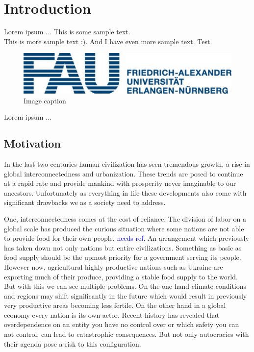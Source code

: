 \chapter{Introduction}
\label{chap:Introduction}

Lorem ipsum ...
This is some sample text.\\
This is more sample text :).
And I have even more sample text.
Test.
%
\begin{figure}[H]
	\centering
	\includegraphics[width=1\textwidth]{img/FAU}
	\caption{Image caption}
	\label{Image_Label}
\end{figure}
%
\noindent
%
Lorem ipsum ...

\section{Motivation}
\label{sec:Motivation}
In the last two centuries human civilization has seen tremendous growth, a rise in global interconnectedness and urbanization.
These trends are posed to continue at a rapid rate and provide mankind with prosperity never imaginable to our ancestors.
Unfortunately as everything in life these developments also come with significant drawbacks we as a society need to address.

One, interconnectedness comes at the cost of reliance.
The division of labor on a global scale has produced the curious situation where some nations are not able to provide food for their own people. \textcolor{blue}{needs ref.}
An arrangement which previously has taken down not only nations but entire civilizations.
Something as basic as food supply should be the upmost priority for a government serving its people.
However now, agricultural highly productive nations such as Ukraine are exporting much of their produce, providing a stable food supply to the world.
But with this we can see multiple problems.
On the one hand climate conditions and regions may shift significantly in the future which would result in previously very productive areas becoming less fertile.
On the other hand in a global economy every nation is its own actor.
Recent history has revealed that overdependence on an entity you have no control over or which safety you can not control, can lead to catastrophic consequences.
But not only autocracies with their agenda pose a risk to this configuration.

